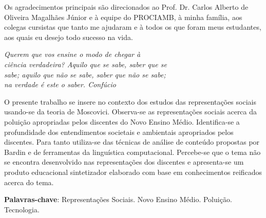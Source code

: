 \documentclass[
  12pt,       %
  openright,      %
  twoside,      %
  a4paper,      %
  english,      %
  french,       %
  spanish,      %
  brazil        %
  ]{abntex2}
\begin{document}
\begin{agradecimentos}
Os agradecimentos principais são direcionados ao Prof. Dr. Carlos Alberto de Oliveira Magalhães Júnior e à equipe do PROCIAMB, à minha família, aos colegas cursistas que tanto me ajudaram e à todos os que foram meus estudantes, aos quais eu desejo todo sucesso na vida.

\end{agradecimentos}

\begin{epigrafe}
    \vspace*{\fill}
  \begin{flushright}
    \textit{Querem que vos ensine o modo de chegar à \\
    ciência verdadeira? Aquilo que se sabe, saber que se \\
    sabe; aquilo que não se sabe, saber que não se sabe; \\
    na verdade é este o saber. Confúcio}
  \end{flushright}
\end{epigrafe}


\setlength{\absparsep}{18pt} %
\begin{resumo}
 O presente trabalho se insere no contexto dos estudos das representações sociais usando-se da teoria de Moscovici. Observa-se as representações sociais acerca da poluição apropriadas pelos discentes do Novo Ensino Médio. Identifica-se a profundidade dos entendimentos societais e ambientais apropriados pelos discentes. Para tanto utiliza-se das técnicas de análise de conteúdo propostas por Bardin e de ferramentas da linguística computacional. Percebe-se que o tema não se encontra desenvolvido nas representações dos discentes e apresenta-se um produto educacional sintetizador elaborado com base em conhecimentos reificados acerca do tema.

 \textbf{Palavras-chave}: Representações Sociais. Novo Ensino Médio. Poluição. Tecnologia.
\end{resumo}
\end{document}
